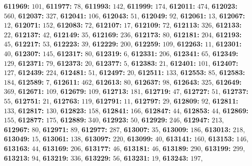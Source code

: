 \textsf{\bfseries 611969:} $101$, \textsf{\bfseries 611977:} $78$, \textsf{\bfseries 611993:} $142$, \textsf{\bfseries 611999:} $174$, \textsf{\bfseries 612011:} $474$, \textsf{\bfseries 612023:} $560$, \textsf{\bfseries 612037:} $327$, \textsf{\bfseries 612041:} $106$, \textsf{\bfseries 612043:} $51$, \textsf{\bfseries 612049:} $92$, \textsf{\bfseries 612061:} $13$, \textsf{\bfseries 612067:} $12$, \textsf{\bfseries 612071:} $152$, \textsf{\bfseries 612083:} $72$, \textsf{\bfseries 612107:} $17$, \textsf{\bfseries 612109:} $72$, \textsf{\bfseries 612113:} $326$, \textsf{\bfseries 612133:} $22$, \textsf{\bfseries 612137:} $42$, \textsf{\bfseries 612149:} $35$, \textsf{\bfseries 612169:} $236$, \textsf{\bfseries 612173:} $80$, \textsf{\bfseries 612181:} $204$, \textsf{\bfseries 612193:} $45$, \textsf{\bfseries 612217:} $53$, \textsf{\bfseries 612223:} $39$, \textsf{\bfseries 612229:} $200$, \textsf{\bfseries 612259:} $109$, \textsf{\bfseries 612263:} $11$, \textsf{\bfseries 612301:} $40$, \textsf{\bfseries 612307:} $145$, \textsf{\bfseries 612317:} $80$, \textsf{\bfseries 612319:} $6$, \textsf{\bfseries 612331:} $206$, \textsf{\bfseries 612341:} $65$, \textsf{\bfseries 612349:} $129$, \textsf{\bfseries 612371:} $79$, \textsf{\bfseries 612373:} $20$, \textsf{\bfseries 612377:} $5$, \textsf{\bfseries 612383:} $21$, \textsf{\bfseries 612401:} $101$, \textsf{\bfseries 612407:} $127$, \textsf{\bfseries 612439:} $224$, \textsf{\bfseries 612481:} $51$, \textsf{\bfseries 612497:} $20$, \textsf{\bfseries 612511:} $133$, \textsf{\bfseries 612553:} $85$, \textsf{\bfseries 612583:} $184$, \textsf{\bfseries 612589:} $7$, \textsf{\bfseries 612611:} $462$, \textsf{\bfseries 612613:} $80$, \textsf{\bfseries 612637:} $98$, \textsf{\bfseries 612643:} $325$, \textsf{\bfseries 612649:} $369$, \textsf{\bfseries 612671:} $109$, \textsf{\bfseries 612679:} $109$, \textsf{\bfseries 612713:} $181$, \textsf{\bfseries 612719:} $47$, \textsf{\bfseries 612727:} $51$, \textsf{\bfseries 612737:} $55$, \textsf{\bfseries 612751:} $21$, \textsf{\bfseries 612763:} $119$, \textsf{\bfseries 612791:} $11$, \textsf{\bfseries 612797:} $29$, \textsf{\bfseries 612809:} $92$, \textsf{\bfseries 612811:} $133$, \textsf{\bfseries 612817:} $130$, \textsf{\bfseries 612823:} $158$, \textsf{\bfseries 612841:} $166$, \textsf{\bfseries 612847:} $44$, \textsf{\bfseries 612853:} $44$, \textsf{\bfseries 612869:} $155$, \textsf{\bfseries 612877:} $175$, \textsf{\bfseries 612889:} $340$, \textsf{\bfseries 612923:} $50$, \textsf{\bfseries 612929:} $246$, \textsf{\bfseries 612947:} $213$, \textsf{\bfseries 612967:} $80$, \textsf{\bfseries 612971:} $89$, \textsf{\bfseries 612977:} $287$, \textsf{\bfseries 613007:} $35$, \textsf{\bfseries 613009:} $186$, \textsf{\bfseries 613013:} $218$, \textsf{\bfseries 613049:} $15$, \textsf{\bfseries 613061:} $138$, \textsf{\bfseries 613097:} $220$, \textsf{\bfseries 613099:} $40$, \textsf{\bfseries 613141:} $160$, \textsf{\bfseries 613153:} $146$, \textsf{\bfseries 613163:} $44$, \textsf{\bfseries 613169:} $206$, \textsf{\bfseries 613177:} $46$, \textsf{\bfseries 613181:} $46$, \textsf{\bfseries 613189:} $290$, \textsf{\bfseries 613199:} $299$, \textsf{\bfseries 613213:} $94$, \textsf{\bfseries 613219:} $336$, \textsf{\bfseries 613229:} $56$, \textsf{\bfseries 613231:} $19$, \textsf{\bfseries 613243:} $197$, 
